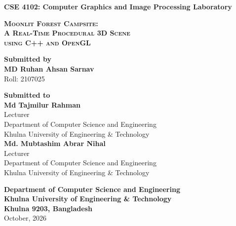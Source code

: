 \documentclass[12pt,a4paper]{report}
\begin{document}
\begin{titlepage}
\begin{center}

\textbf{\fontsize{14}{21}\selectfont CSE 4102: Computer Graphics and Image Processing Laboratory}

\vspace{2.4cm}

{\fontsize{20}{30}\selectfont \textbf{\textsc{Moonlit Forest Campsite:\\[6pt]
A Real-Time Procedural 3D Scene\\[6pt]
using C++ and OpenGL}}}

\vspace{2.6cm}

{\fontsize{14}{21}\selectfont \textbf{Submitted by}}\\[10pt]
{\fontsize{14}{21}\selectfont \textbf{MD Ruhan Ahsan Sarnav}}\\[4pt]
{\fontsize{12}{18}\selectfont Roll: 2107025}

\vspace{1.8cm}

{\fontsize{14}{21}\selectfont \textbf{Submitted to}}\\[10pt]
{\fontsize{12}{18}\selectfont \textbf{Md Tajmilur Rahman}}\\
{\fontsize{12}{18}\selectfont Lecturer}\\
{\fontsize{12}{18}\selectfont Department of Computer Science and Engineering}\\
{\fontsize{12}{18}\selectfont Khulna University of Engineering \& Technology}\\[16pt]
{\fontsize{12}{18}\selectfont \textbf{Md. Mubtashim Abrar Nihal}}\\
{\fontsize{12}{18}\selectfont Lecturer}\\
{\fontsize{12}{18}\selectfont Department of Computer Science and Engineering}\\
{\fontsize{12}{18}\selectfont Khulna University of Engineering \& Technology}

\vfill

{\fontsize{12}{16}\selectfont \textbf{Department of Computer Science and Engineering\\
Khulna University of Engineering \& Technology\\
Khulna 9203, Bangladesh}}\\[6pt]
{\fontsize{12}{16}\selectfont October, 2026}

\end{center}
\end{titlepage}
\end{document}
